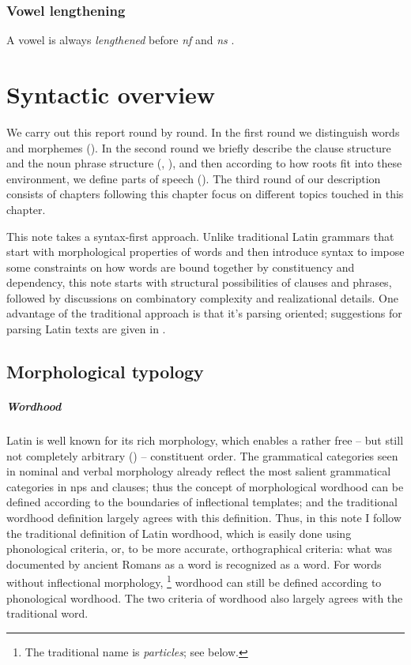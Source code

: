 \documentclass[a4paper, oneside, 12pt]{report}
\newcommand*{\citepage}[1]{p.~{#1}}
\newcommand*{\term}[1]{\emph{#1}}
\newcommand{\form}[1]{\emph{#1}}
\begin{document}
\subsection{Vowel lengthening}

A vowel is always \emph{lengthened} before \form{nf} and \form{ns}
\citep[\citepage{55}]{oniga2014latin}.

\chapter{Syntactic overview}

We carry out this report round by round.
In the first round we distinguish words and morphemes
().
In the second round we briefly describe the clause structure and the noun phrase structure
(, ),
and then according to how roots fit into these environment,
we define parts of speech (). 
The third round of our description
consists of chapters following this chapter focus on different topics touched in this chapter.

This note takes a syntax-first approach.
Unlike traditional Latin grammars that start with morphological properties of words
and then introduce syntax to impose some constraints on how words are bound together
by constituency and dependency,
this note starts with structural possibilities of clauses and phrases,
followed by discussions on combinatory complexity and realizational details.
One advantage of the traditional approach is that it's parsing oriented;
suggestions for parsing Latin texts are given in .

\section{Morphological typology}\label{sec:grammatical.word}

\paragraph*{Wordhood}

Latin is well known for its rich morphology,
which enables a rather free -- but still not completely arbitrary ()
-- constituent order.
The grammatical categories seen in nominal and verbal morphology 
already reflect the most salient grammatical categories
in \acs{np}s and clauses;
thus the concept of morphological wordhood can be defined according to 
the boundaries of inflectional templates;
and the traditional wordhood definition largely agrees with this definition. 
Thus, in this note I follow the traditional definition of Latin wordhood,
which is easily done using phonological criteria,
or, to be more accurate, orthographical criteria: 
what was documented by ancient Romans as a word 
is recognized as a word.
For words without inflectional morphology,%
\footnote{
    The traditional name is \term{particles};
    see below.
} 
wordhood can still be defined according to phonological wordhood.
The two criteria of wordhood also largely agrees with the traditional word.
\end{document}
